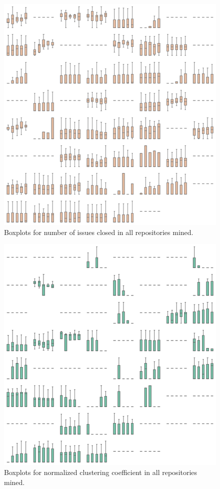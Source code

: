 \begin{appendices}
    \begin{figure}[!htb]
        \centering
        \includegraphics[width=\textwidth]{figures/quantitative/boxplots/grids/issues_closed.png}
        \caption{Boxplots for number of issues closed  in all repositories mined.}
        \label{app:issues_closed-box-app}
    \end{figure}

    \begin{figure}[!htb]
        \centering
        \includegraphics[width=\textwidth]{figures/quantitative/boxplots/grids/clustering.png}
        \caption{Boxplots for normalized clustering coefficient in all repositories mined.}
        \label{app:clustering-box-app}
    \end{figure}

\end{appendices}
